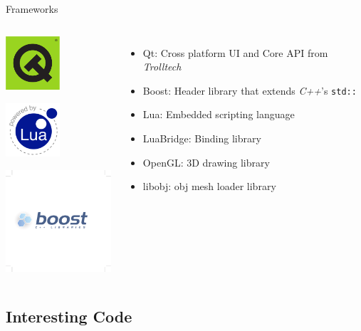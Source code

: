 \documentclass[12pt,ucs,hyperref={pdftext}]{beamer}
\newlength{\columnleft}
\newlength{\columnright}
\begin{document}
\begin{frame}{Frameworks}
\begin{columns}

\column{\columnleft}

\begin{center}
\includegraphics[width=2cm]{media/logo/qt_original_r.pdf}

\bigskip

\includegraphics[width=2cm]{media/logo/lua-logo-label.pdf}

\bigskip

\includegraphics[width=4cm]{media/logo/boost-vec-white.pdf}
\end{center}

\column{\columnright}
\begin{itemize}%
\item Qt: Cross platform UI and Core API from \textit{Trolltech}
\item Boost: Header library that extends \textit{C++}'s \lstinline{std::}
\item Lua: Embedded scripting language
\item LuaBridge: Binding library
\item OpenGL: 3D drawing library
\item libobj: obj mesh loader library
\end{itemize}

\end{columns}
\end{frame}


\subsection{Interesting Code}
\end{document}
